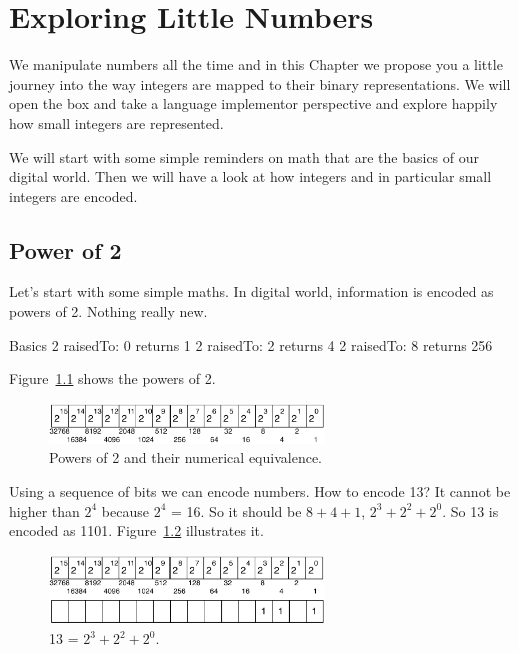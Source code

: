 \documentclass[a4paper,10pt,twoside]{book}
\begin{document}
\fi
\sloppy

\chapter{Exploring Little Numbers}

We manipulate numbers all the time and in this Chapter we propose you a little journey into the way 
integers are mapped to their binary representations. We will open the box and take a language implementor perspective and explore happily how small integers are represented. 

We will start with some simple reminders on math that are the basics of our digital world. Then we will have a look at how integers and in particular small integers are encoded.

\section{Power of 2}

Let's start with some simple maths. In digital world, information is encoded as powers of 2. Nothing really new. 

\begin{code}{Basics}
2 raisedTo: 0
	returns 1
2 raisedTo: 2
	returns 4
2 raisedTo: 8
	returns 256
\end{code}

Figure~\ref{power} shows the powers of 2. 
\begin{figure}[h]
\begin{center}
\includegraphics[width=0.65\textwidth]{16bits-number}
\caption{Powers of 2 and their numerical equivalence.\label{power}}
\end{center}
\end{figure}

Using a sequence of bits we can encode numbers. How to encode 13? It cannot be higher than $2^{4}$ because $2^{4}$ = 16. So it should be $8 + 4 + 1$, $2^{3} + 2^{2} + 2^{0}$. So 13 is encoded as 1101.  Figure~\ref{16bits-number13} illustrates it.

\begin{figure}[h]
\begin{center}
\includegraphics[width=0.65\textwidth]{16bits-number13}
\caption{13 = $2^{3} + 2^{2} + 2^{0}$.\label{16bits-number13}}
\end{center}
\end{figure}
\end{document}
